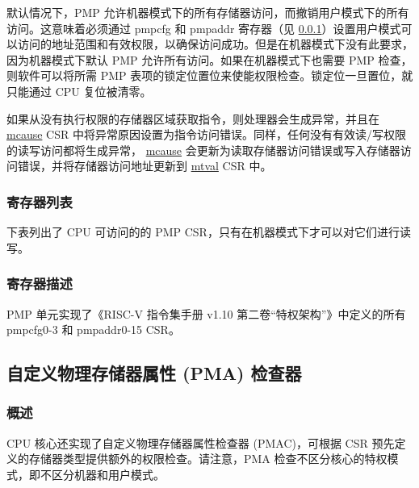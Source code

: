 \documentclass[main\_\_CN.tex]{subfiles}
\begin{document}
默认情况下，PMP 允许机器模式下的所有存储器访问，而撤销用户模式下的所有访问。这意味着必须通过 pmpcfg 和 pmpaddr 寄存器（见 \ref{sec:riscvcpu-pmp-reg-summ}）设置用户模式可以访问的地址范围和有效权限，以确保访问成功。但是在机器模式下没有此要求，因为机器模式下默认 PMP 允许所有访问。如果在机器模式下也需要 PMP 检查，则软件可以将所需 PMP 表项的锁定位置位来使能权限检查。锁定位一旦置位，就只能通过 CPU 复位被清零。

如果从没有执行权限的存储器区域获取指令，则处理器会生成异常，并且在 \hyperref[regdesc:MCAUSE]{mcause} CSR 中将异常原因设置为指令访问错误。同样，任何没有有效读/写权限的读写访问都将生成异常， \hyperref[regdesc:MCAUSE]{mcause} 会更新为读取存储器访问错误或写入存储器访问错误，并将存储器访问地址更新到 \hyperref[regdesc:MTVAL]{mtval} CSR 中。


\newpage
\hypertarget{riscvcpu-pmp-reg-summ}{}
\subsubsection{寄存器列表}
\label{sec:riscvcpu-pmp-reg-summ}

下表列出了 CPU 可访问的的 PMP CSR，只有在机器模式下才可以对它们进行读写。




\subsubsection{寄存器描述}
\label{sec:riscvcpu-pmp-reg-desc}

PMP 单元实现了《RISC-V 指令集手册 v1.10 第二卷“特权架构”》中定义的所有 pmpcfg0-3 和 pmpaddr0-15 CSR。




\newpage
\subsection{自定义物理存储器属性 (PMA) 检查器}
\label{sec:riscvcpu-pma}
\subsubsection{概述}
\label{sec:riscvcpu-pma-overview}
CPU 核心还实现了自定义物理存储器属性检查器 (PMAC)，可根据 CSR 预先定义的存储器类型提供额外的权限检查。请注意，PMA 检查不区分核心的特权模式，即不区分机器和用户模式。
\end{document}
